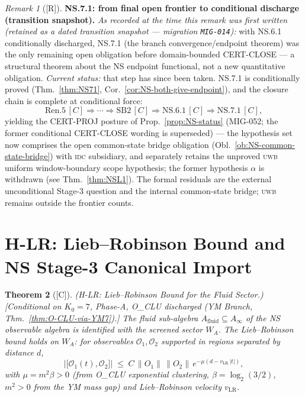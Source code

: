 \documentclass[12pt,oneside]{amsbook}
\theoremstyle{plain}
\newtheorem{theorem}{Theorem}[section]
\theoremstyle{definition}
\theoremstyle{remark}
\newtheorem{remark}[theorem]{Remark}
\newcommand{\status}[1]{\textup{[#1]}}
\begin{document}
\begin{remark}[\status{R}]\label{rem:NS7-now-accessible}
\textbf{NS.7.1: from final open frontier to conditional discharge
(transition snapshot).}
\emph{As recorded at the time this remark was first written
(retained as a dated transition snapshot --- migration
\texttt{MIG-014}):} with NS.6.1 conditionally discharged, NS.7.1 (the
branch convergence/endpoint theorem) was the only remaining open
obligation before domain-bounded CERT-CLOSE --- a structural theorem
about the NS endpoint functional, not a new quantitative obligation.
\emph{Current status:} that step has since been taken. NS.7.1 is
conditionally proved (Thm.~\ref{thm:NS71},
Cor.~\ref{cor:NS-both-give-endpoint}), and the closure chain is
complete at conditional force:
\[
 \mathrm{Ren.5}\,[C] \Rightarrow \cdots \Rightarrow
 \mathrm{SB2}\,[C] \Rightarrow \mathrm{NS.6.1}\,[C]
 \Rightarrow \mathrm{NS.7.1}\,[C],
\]
yielding the CERT-PROJ posture of
Prop.~\ref{prop:NS-status} (MIG-052; the former conditional
CERT-CLOSE wording is superseded) --- the hypothesis set now
comprises the open common-state bridge obligation
(Obl.~\ref{ob:NS-common-state-bridge}) with \textsc{idc} subsidiary,
and separately retains the unproved \textsc{uwb} uniform
window-boundary scope hypothesis; the former hypothesis $\alpha$ is
withdrawn (see Thm.~\ref{thm:NSL1}). The formal residuals are the
external unconditional Stage-3 question and the internal common-state
bridge; \textsc{uwb} remains outside the frontier counts.
\end{remark}

\section{H-LR: Lieb--Robinson Bound and NS Stage-3 Canonical Import}
\label{sec:ns-hlr}

\begin{theorem}[\status{C}]\label{thm:NS-H-LR}
\textup{(H-LR: Lieb--Robinson Bound for the Fluid Sector.)}
\textup{[Conditional on $K_0=7$, Phase-A, O\_CLU discharged
(YM Branch, Thm.~\ref{thm:O-CLU-via-YM7}).]}
The fluid sub-algebra $A_{\mathrm{fluid}} \subseteq A_\infty$ of
the NS observable algebra is identified with the screened sector
$W_A$. The Lieb--Robinson bound holds on $W_A$: for observables
$\mathcal{O}_1, \mathcal{O}_2$ supported in regions separated by
distance $d$,
\[
 \bigl|\bigl[\mathcal{O}_1(t), \mathcal{O}_2\bigr]\bigr|
 \;\leq\; C\,\|O_1\|\,\|O_2\|\,e^{-\mu(d - v_{\mathrm{LR}}\,|t|)},
\]
with $\mu = m^2\beta > 0$ (from O\_CLU exponential clustering,
$\beta = \log_2(3/2)$, $m^2 > 0$ from the YM mass gap) and
Lieb--Robinson velocity $v_{\mathrm{LR}}$.
\end{theorem}
\end{document}
